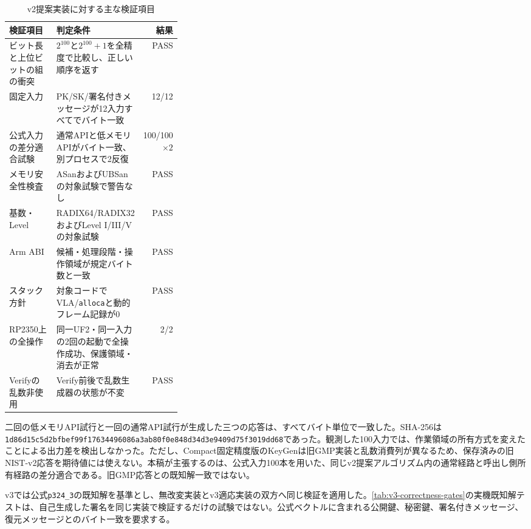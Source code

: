 \documentclass[a4paper,10pt]{ltjsarticle}
\theoremstyle{definition}
\theoremstyle{remark}
\begin{document}
\begin{table}[H]
  \centering
  \caption{v2提案実装に対する主な検証項目}
  \label{tab:correctness-gates}
  \small
  \begin{tabularx}{\linewidth}{@{}p{0.33\linewidth}Xr@{}}
    \toprule
    検証項目 & 判定条件 & 結果 \\
    \midrule
    ビット長と上位ビットの組の衝突 & $2^{100}$と$2^{100}+1$を全精度で比較し、正しい順序を返す & PASS \\
    固定入力 & PK/SK/署名付きメッセージが12入力すべてでバイト一致 & 12/12 \\
    公式入力の差分適合試験 & 通常APIと低メモリAPIがバイト一致、別プロセスで2反復 & 100/100 $\times 2$ \\
    メモリ安全性検査 & ASanおよびUBSanの対象試験で警告なし & PASS \\
    基数・Level & RADIX64/RADIX32およびLevel I/III/Vの対象試験 & PASS \\
    Arm ABI & 候補・処理段階・操作領域が規定バイト数と一致 & PASS \\
    スタック方針 & 対象コードでVLA/\texttt{alloca}と動的フレーム記録が0 & PASS \\
    RP2350上の全操作 & 同一UF2・同一入力の2回の起動で全操作成功、保護領域・消去が正常 & 2/2 \\
    Verifyの乱数非使用 & Verify前後で乱数生成器の状態が不変 & PASS \\
    \bottomrule
  \end{tabularx}
\end{table}

二回の低メモリAPI試行と一回の通常API試行が生成した三つの応答は、すべてバイト単位で一致した。SHA-256は\texttt{1d86d15c5d2bfbef99f17634496086a3ab80f0e848d34d3e9409d75f3019dd68}であった。観測した100入力では、作業領域の所有方式を変えたことによる出力差を検出しなかった。ただし、Compact固定精度版のKeyGenは旧GMP実装と乱数消費列が異なるため、保存済みの旧NIST-v2応答を期待値には使えない。本稿が主張するのは、公式入力100本を用いた、同じv2提案アルゴリズム内の通常経路と呼出し側所有経路の差分適合である。旧GMP応答との既知解一致ではない。

v3では公式\texttt{p324\_3}の既知解を基準とし、無改変実装とv3適応実装の双方へ同じ検証を適用した。\cref{tab:v3-correctness-gates}の実機既知解テストは、自己生成した署名を同じ実装で検証するだけの試験ではない。公式ベクトルに含まれる公開鍵、秘密鍵、署名付きメッセージ、復元メッセージとのバイト一致を要求する。
\end{document}
